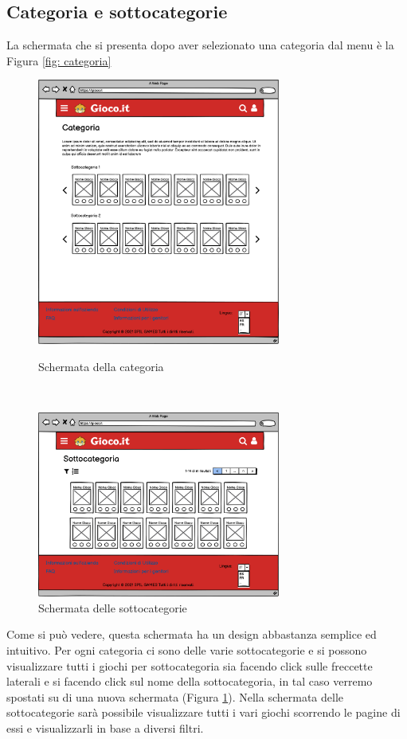 \documentclass[../Report.tex]{subfiles}
\begin{document}
    \subsection{Categoria e sottocategorie}
    La schermata che si presenta dopo aver selezionato una categoria dal menu è la Figura \ref{fig: categoria}
    \begin{figure}[H]
        \hspace{-1.5cm}
        \begin{minipage}[b]{8cm}
            \centering
            \includegraphics[width=8cm]{WCategorySection.png}
            \caption{Schermata della categoria}
            \label{fig: categoria}
            \end{minipage}
            \ \hspace{2mm} \hspace{3mm} \
            \begin{minipage}[b]{8cm}
            \centering
            \includegraphics[width=8cm]{WSubcategorySection.png}
            \caption{Schermata delle sottocategorie}
            \label{fig: sottocategorie}
        \end{minipage}
    \end{figure}
    Come si può vedere, questa schermata ha un design abbastanza semplice ed intuitivo. Per ogni categoria ci sono delle varie sottocategorie e si possono visualizzare tutti i giochi per sottocategoria sia facendo click sulle freccette laterali e si facendo click sul nome della sottocategoria, in tal caso verremo spostati su di una nuova schermata (Figura \ref{fig: sottocategorie}). Nella schermata delle sottocategorie sarà possibile visualizzare tutti i vari giochi scorrendo le pagine di essi e visualizzarli in base a diversi filtri.
\end{document}
